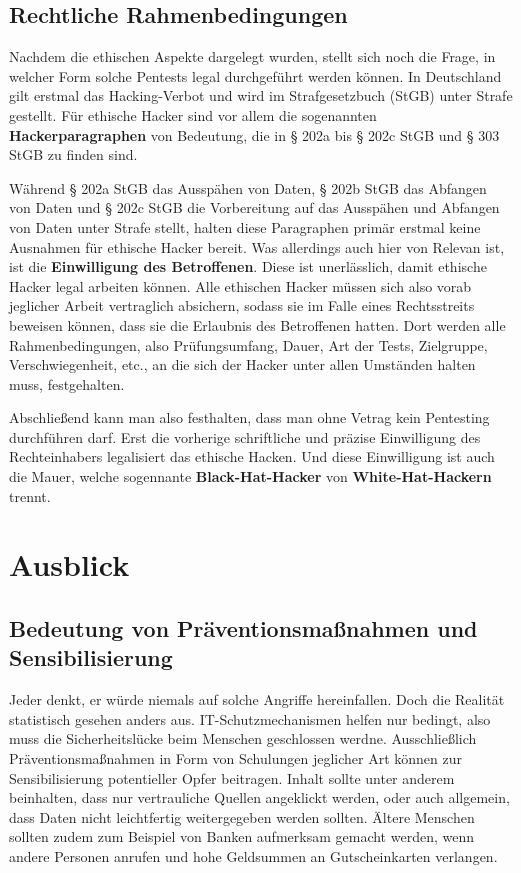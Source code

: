 \documentclass[12pt, a4paper, oneside]{scrartcl}
\begin{document}
\subsection{Rechtliche Rahmenbedingungen}
Nachdem die ethischen Aspekte dargelegt wurden, stellt sich noch die Frage, in welcher Form solche 
Pentests legal durchgeführt werden können. In Deutschland gilt erstmal das Hacking-Verbot und wird 
im Strafgesetzbuch (StGB) unter Strafe gestellt. Für ethische Hacker sind vor allem die  
sogenannten \textbf{Hackerparagraphen} von Bedeutung, die in § 202a bis § 202c StGB und § 303 StGB zu finden sind.
\par
Während § 202a StGB das Ausspähen von Daten, § 202b StGB das Abfangen von Daten und § 202c StGB 
die Vorbereitung auf das Ausspähen und Abfangen von Daten unter Strafe stellt, halten diese Paragraphen
primär erstmal keine Ausnahmen für ethische Hacker bereit. Was allerdings auch hier von Relevan ist, 
ist die \textbf{Einwilligung des Betroffenen}. Diese ist unerlässlich, damit ethische Hacker legal arbeiten können.
Alle ethischen Hacker müssen sich also vorab jeglicher Arbeit vertraglich absichern, sodass sie im 
Falle eines Rechtsstreits beweisen können, dass sie die Erlaubnis des Betroffenen hatten. Dort werden alle
Rahmenbedingungen, also Prüfungsumfang, Dauer, Art der Tests, Zielgruppe, Verschwiegenheit, etc., an die sich der Hacker 
unter allen Umständen halten muss, festgehalten.
\par
Abschließend kann man also festhalten, dass man ohne Vetrag kein Pentesting durchführen darf. Erst die vorherige
schriftliche und präzise Einwilligung des Rechteinhabers legalisiert das ethische Hacken. Und diese Einwilligung
ist auch die Mauer, welche sogennante \textbf{Black-Hat-Hacker} von \textbf{White-Hat-Hackern} trennt.\\


\section{Ausblick}

\subsection{Bedeutung von Präventionsmaßnahmen und Sensibilisierung}
Jeder denkt, er würde niemals auf solche Angriffe hereinfallen. Doch die Realität statistisch gesehen
anders aus. IT-Schutzmechanismen helfen nur bedingt, also muss die Sicherheitslücke beim Menschen
geschlossen werdne. Ausschließlich Präventionsmaßnahmen in Form von Schulungen jeglicher Art können
zur Sensibilisierung potentieller Opfer beitragen. Inhalt sollte unter anderem beinhalten, dass
nur vertrauliche Quellen angeklickt werden, oder auch allgemein, dass Daten nicht leichtfertig
weitergegeben werden sollten. Ältere Menschen sollten zudem zum Beispiel von Banken aufmerksam gemacht
werden, wenn andere Personen anrufen und hohe Geldsummen an Gutscheinkarten verlangen.
\end{document}
